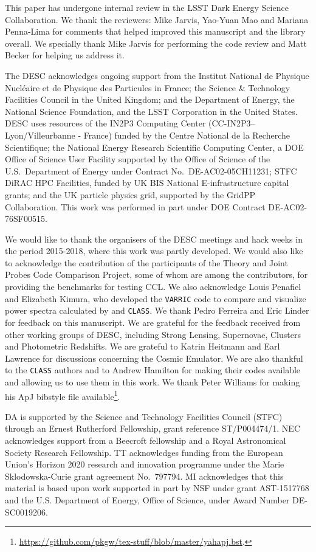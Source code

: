 %
This paper has undergone internal review in the LSST Dark Energy Science Collaboration. We thank the reviewers: Mike Jarvis, Yao-Yuan Mao and Mariana Penna-Lima for comments that helped improved this manuscript and the \ccl library overall. We specially thank Mike Jarvis for performing the \ccl code review and Matt Becker for helping us address it.

The DESC acknowledges ongoing support from the Institut National de Physique Nucl\'eaire et de Physique des Particules in France; the Science \& Technology Facilities Council in the United Kingdom; and the Department of Energy, the National Science Foundation, and the LSST Corporation in the United States.  DESC uses resources of the IN2P3 Computing Center (CC-IN2P3--Lyon/Villeurbanne - France) funded by the Centre National de la Recherche Scientifique; the National Energy Research Scientific Computing Center, a DOE Office of Science User Facility supported by the Office of Science of the U.S.\ Department of Energy under Contract No.\ DE-AC02-05CH11231; STFC DiRAC HPC Facilities, funded by UK BIS National E-infrastructure capital grants; and the UK particle physics grid, supported by the GridPP Collaboration. This work was performed in part under DOE Contract DE-AC02-76SF00515. 

We would like to thank the organisers of the DESC meetings and hack weeks in the period 2015-2018, where this work was partly developed. We would also like to acknowledge the contribution of the participants of the Theory and Joint Probes Code Comparison Project, some of whom are among the \ccl contributors, for providing the benchmarks for testing CCL. We also acknowledge Louis Penafiel and Elizabeth Kimura, who developed the {\tt VARRIC} code to compare and visualize power spectra calculated by \ccl and {\tt CLASS}. We thank Pedro Ferreira and Eric Linder for feedback on this manuscript. We are grateful for the feedback received from other working groups of DESC, including Strong Lensing, Supernovae, Clusters and Photometric Redshifts. We are grateful to Katrin Heitmann and Earl Lawrence for discussions concerning the Cosmic Emulator. We are also thankful to the {\tt CLASS} authors and to Andrew Hamilton for making their codes available and allowing us to use them in this work. We thank Peter Williams for making his ApJ bibstyle file available\footnote{\url{https://github.com/pkgw/tex-stuff/blob/master/yahapj.bst}.}.  
%

DA is supported by the Science and Technology Facilities Council (STFC) through an Ernest Rutherford Fellowship, grant reference ST/P004474/1. NEC acknowledges support from a Beecroft fellowship and a Royal Astronomical Society Research Fellowship. TT acknowledges funding from the European Union's Horizon 2020 research and innovation programme under the Marie Sk{l}odowska-Curie grant agreement No.\ 797794. MI acknowledges that this material is based upon work supported in part by NSF under grant AST-1517768 and the U.S. Department of Energy, Office of Science, under Award Number DE-SC0019206.
